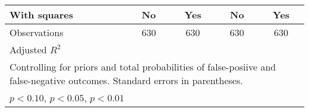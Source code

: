 {\begin{tabular}{l*{4}{c}}
With squares    &       No         &      Yes         &       No         &      Yes         \\
\hline
Observations    &      630         &      630         &      630         &      630         \\
Adjusted \(R^{2}\)&                  &                  &                  &                  \\
\hline\hline
\multicolumn{5}{l}{\footnotesize Controlling for priors and total probabilities of false-posiive and false-negative outcomes. Standard errors in parentheses.}\\
\multicolumn{5}{l}{\footnotesize \sym{*} \(p<0.10\), \sym{**} \(p<0.05\), \sym{***} \(p<0.01\)}\\
\end{tabular}
}
